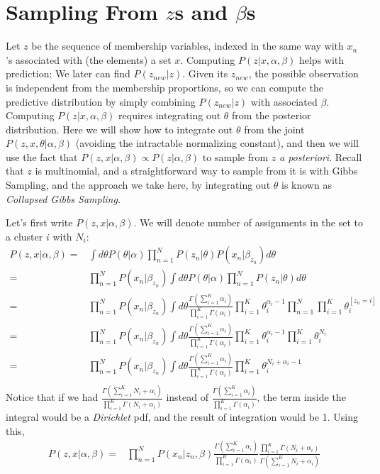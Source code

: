 \documentclass{article}%
\begin{document}
\section{Sampling From $z$s and $\beta$s}
Let $z$ be the sequence of membership variables, indexed in the same way with $x_n$'s associated with (the elements) a set $x$. Computing $P(z|x, \alpha, \beta)$ helps with prediction: We later can find $P(z_{new}|z)$. Given its $z_{new}$, the possible observation is independent from the membership proportions, so we can compute the predictive distribution by simply combining $P(z_{new}|z)$ with associated $\beta$. Computing $P(z|x, \alpha, \beta)$ requires integrating out $\theta$ from the posterior distribution. Here we will show how to integrate out $\theta$ from the joint  $P(z, x, \theta|\alpha, \beta)$ (avoiding the intractable normalizing constant), and then we will use the fact that $P(z, x|\alpha, \beta) \propto P(z|\alpha, \beta)$ to sample from $z$ \textit{a posteriori}. Recall that $z$ is multinomial, and a straightforward way to sample from it is with Gibbs Sampling, and the approach we take here, by integrating out $\theta$ is known as \textit{Collapsed Gibbs Sampling}.

Let's first write $P(z, x|\alpha, \beta)$. We will denote number of assignments in the set to a cluster $i$ with $N_i$:
\begin{align*}
P(z, x|\alpha, \beta) =& \int d\theta P(\theta|\alpha) \prod_{n=1}^{N} P(z_n |\theta) P(x_n|\beta_{z_n}) d\theta\\
=&  \prod_{n=1}^{N} P(x_n|\beta_{z_n})  \int d\theta P(\theta|\alpha) \prod_{n=1}^{N} P(z_n |\theta) d\theta\\
=&  \prod_{n=1}^{N} P(x_n|\beta_{z_n}) \int d\theta \frac{\Gamma(\sum_{i=1}^K \alpha_i)}{\prod_{i=1}^K \Gamma(\alpha_i)}  \prod_{i=1}^K\theta_i^{\alpha_i - 1} \prod_{n=1}^N \prod_{i=1}^K \theta_i^{[z_n = i]}\\
=& \prod_{n=1}^{N} P(x_n|\beta_{z_n})   \int d\theta \frac{\Gamma(\sum_{i=1}^K \alpha_i)}{\prod_{i=1}^K \Gamma(\alpha_i)} \prod_{i=1}^K\theta_i^{\alpha_i - 1} \prod_{i=1}^K \theta_i^{N_i}\\
=& \prod_{n=1}^{N} P(x_n|\beta_{z_n})  \int d\theta \frac{\Gamma(\sum_{i=1}^K \alpha_i)}{\prod_{i=1}^K \Gamma(\alpha_i)}  \prod_{i=1}^K \theta_i^{N_i + \alpha_i -1}\\
\end{align*}
Notice that if we had $\frac{\Gamma(\sum_{i=1}^K N_i + \alpha_i)}{\prod_{i=1}^K \Gamma(N_i + \alpha_i)}$ instead of $\frac{\Gamma(\sum_{i=1}^K \alpha_i)}{\prod_{i=1}^K \Gamma(\alpha_i)}$, the term inside the integral would be a \textit{Dirichlet} pdf, and the result of integration would be 1. Using this, 
\begin{align*}
P(z, x|\alpha, \beta) =& \prod_{n=1}^{N} P(x_n|z_n, \beta) \frac{\Gamma(\sum_{i=1}^K \alpha_i)}{\prod_{i=1}^K \Gamma(\alpha_i)}  \frac{\prod_{i=1}^K \Gamma(N_i + \alpha_i)}{\Gamma(\sum_{i=1}^K N_i + \alpha_i)}\\
\end{align*}
\end{document}
